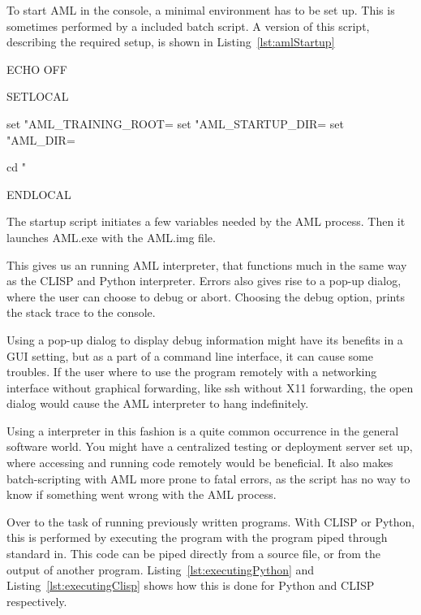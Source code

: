 To start AML in the console, a minimal environment has to be set up. This is sometimes performed by a included batch script. A version of this script, describing the required setup, is shown in Listing~\ref{lst:amlStartup}

\begin{bash}[caption={AML5-startup-win32.bat},label={lst:amlStartup}]
ECHO OFF

SETLOCAL

set "AML_TRAINING_ROOT=%
set "AML_STARTUP_DIR=%
set "AML_DIR=%

cd %
"%

ENDLOCAL
\end{bash}

The startup script initiates a few variables needed by the AML process. Then it launches AML.exe with the AML.img file.

This gives us an running AML interpreter, that functions much in the same way as the CLISP and Python interpreter. Errors also gives rise to a pop-up dialog, where the user can choose to debug or abort. Choosing the debug option, prints the stack trace to the console.

Using a pop-up dialog to display debug information might have its benefits in a GUI setting, but as a part of a command line interface, it can cause some troubles. If the user where to use the program remotely with a networking interface without graphical forwarding, like ssh without X11 forwarding, the open dialog would cause the AML interpreter to hang indefinitely.

Using a interpreter in this fashion is a quite common occurrence in the general software world. You might have a centralized testing or deployment server set up, where accessing and running code remotely would be beneficial. It also makes batch-scripting with AML more prone to fatal errors, as the script has no way to know if something went wrong with the AML process.

Over to the task of running previously written programs. With CLISP or Python, this is performed by executing the program with the program piped through standard in. This code can be piped directly from a source file, or from the output of another program. Listing~\ref{lst:executingPython} and Listing~\ref{lst:executingClisp} shows how this is done for Python and CLISP respectively.


